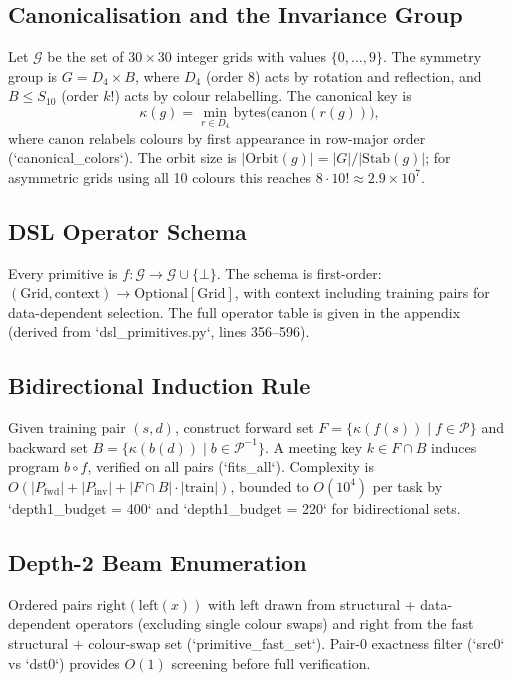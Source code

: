 \documentclass[11pt,a4paper]{article}
\begin{document}
\subsection{Canonicalisation and the Invariance Group}

Let $\mathcal{G}$ be the set of $30 \times 30$ integer grids with values $\{0,\dots,9\}$. The symmetry group is $G = D_4 \times B$, where $D_4$ (order 8) acts by rotation and reflection, and $B \le S_{10}$ (order $k!$) acts by colour relabelling. The canonical key is
\[
\kappa(g) = \min_{r \in D_4} \mathrm{bytes}\bigl(\mathrm{canon}(r(g))\bigr),
\]
where $\mathrm{canon}$ relabels colours by first appearance in row-major order (`canonical_colors`). The orbit size is $|\mathrm{Orbit}(g)| = |G| / |\mathrm{Stab}(g)|$; for asymmetric grids using all 10 colours this reaches $8 \cdot 10! \approx 2.9 \times 10^7$.

\subsection{DSL Operator Schema}

Every primitive is $f: \mathcal{G} \to \mathcal{G} \cup \{\bot\}$. The schema is first-order: $(\mathrm{Grid}, \mathrm{context}) \to \mathrm{Optional}[\mathrm{Grid}]$, with context including training pairs for data-dependent selection. The full operator table is given in the appendix (derived from `dsl_primitives.py`, lines 356--596).

\subsection{Bidirectional Induction Rule}

Given training pair $(s,d)$, construct forward set $F = \{\kappa(f(s)) \mid f \in \mathcal{P}\}$ and backward set $B = \{\kappa(b(d)) \mid b \in \mathcal{P}^{-1}\}$. A meeting key $k \in F \cap B$ induces program $b \circ f$, verified on all pairs (`fits_all`). Complexity is $O(|P_{\mathrm{fwd}}| + |P_{\mathrm{inv}}| + |F \cap B| \cdot |\mathrm{train}|)$, bounded to $O(10^4)$ per task by `depth1_budget = 400` and `depth1_budget = 220` for bidirectional sets.

\subsection{Depth-2 Beam Enumeration}

Ordered pairs $\mathrm{right}(\mathrm{left}(x))$ with $\mathrm{left}$ drawn from structural + data-dependent operators (excluding single colour swaps) and $\mathrm{right}$ from the fast structural + colour-swap set (`primitive_fast_set`). Pair-0 exactness filter (`src0` vs `dst0`) provides $O(1)$ screening before full verification.
\end{document}
